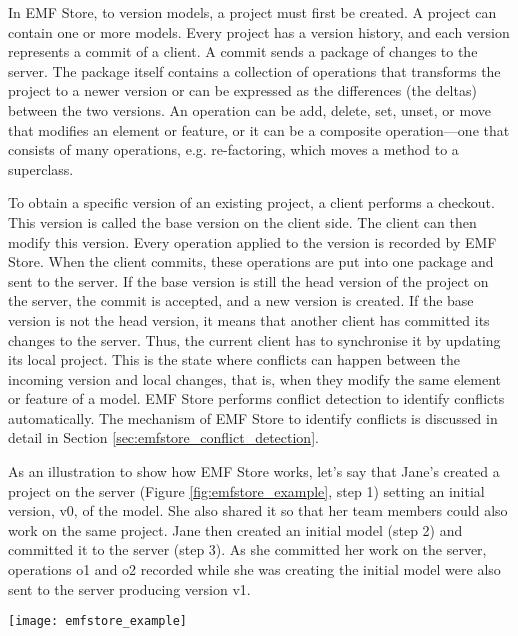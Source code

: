 In EMF Store, to version models, a project must first be created. A project can contain one or more models. Every project has a version history, and each version represents a commit of a client. A commit sends a package of changes to the server. The package itself contains a collection of operations that transforms the project to a newer version or can be expressed as the differences (the deltas) between the two versions. An operation can be add, delete, set, unset, or move that modifies an element or feature, or it can be a composite operation—one that consists of many operations, e.g. re-factoring, which moves a method to a superclass.

To obtain a specific version of an existing project, a client performs a checkout. This version is called the base version on the client side. The client can then modify this version. Every operation applied to the version is recorded by EMF Store. When the client commits, these operations are put into one package and sent to the server. If the base version is still the head version of the project on the server, the commit is accepted, and a new version is created. If the base version is not the head version, it means that another client has committed its changes to the server. Thus, the current client has to synchronise it by updating its local project. This is the state where conflicts can happen between the incoming version and local changes, that is, when they modify the same element or feature of a model. EMF Store performs conflict detection to identify conflicts automatically. The mechanism of EMF Store to identify conflicts is discussed in detail in Section \ref{sec:emfstore_conflict_detection}.

As an illustration to show how EMF Store works, let's say that Jane's created a project on the server (Figure \ref{fig:emfstore_example}, step 1) setting an initial version, \textsf{v0}, of the model. She also shared it so that her team members could also work on the same project. Jane then created an initial model (step 2) and committed it to the server (step 3). As she committed her work on the server, operations \textsf{o1} and \textsf{o2} recorded while she was creating the initial model were also sent to the server producing version \textsf{v1}.

\begin{figure*}[h]
  \centering
  \texttt{[image: emfstore\_example]}
  \caption{An example to show how EMF Store works.}
  \label{fig:emfstore_example}
\end{figure*}

